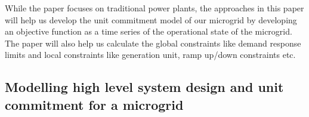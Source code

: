 \documentclass[a4paper]{article}
\begin{document}
While the paper focuses on traditional power plants, the approaches in this paper will help us develop the unit commitment model of our microgrid by developing an objective function as a time series of the operational state of the microgrid. The paper will also help us calculate the global constraints like demand response limits and local constraints like generation unit, ramp up/down constraints etc. 




\subsection{Modelling high level system design and unit commitment for a microgrid}
\end{document}
